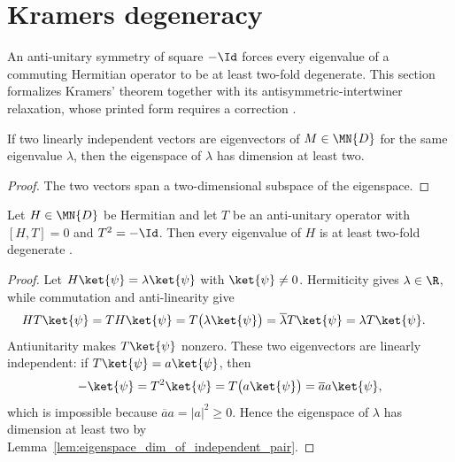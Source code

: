 \section{Kramers degeneracy}
\label{sec:kramers_degeneracy}

An anti-unitary symmetry of square $-\Id$ forces every eigenvalue of a
commuting Hermitian operator to be at least two-fold degenerate.  This section
formalizes Kramers' theorem together with its antisymmetric-intertwiner
relaxation, whose printed form requires a correction
\cite[Chapter~3]{Wolf2012Quantum}.

\begin{lemma}
    \label{lem:eigenspace_dim_of_independent_pair}
    \leanok
    If two linearly independent vectors are eigenvectors of $M\in\MN{D}$ for the
    same eigenvalue $\lambda$, then the eigenspace of $\lambda$ has dimension at
    least two.
\end{lemma}

\begin{proof}\leanok
    The two vectors span a two-dimensional subspace of the eigenspace.
\end{proof}

\begin{theorem}
    \label{thm:kramers_degeneracy}
    \leanok
    Let $H\in\MN{D}$ be Hermitian and let $T$ be an anti-unitary operator with
    $[H,T]=0$ and $T^2=-\Id$.  Then every eigenvalue of $H$ is at least
    two-fold degenerate
    \cite[Chapter~3, Theorem~3.1]{Wolf2012Quantum}.
\end{theorem}

\begin{proof}\leanok
    Let $H\ket{\psi}=\lambda\ket{\psi}$ with $\ket{\psi}\neq 0$.  Hermiticity
    gives $\lambda\in\R$, while commutation and anti-linearity give
    \begin{align}
        H T\ket{\psi}
         & =T H\ket{\psi}
        =T\bigl(\lambda\ket{\psi}\bigr)
        =\overline\lambda T\ket{\psi}
        =\lambda T\ket{\psi}.
    \end{align}
    Antiunitarity makes $T\ket{\psi}$ nonzero.  These two eigenvectors are
    linearly independent: if $T\ket{\psi}=a\ket{\psi}$, then
    \begin{align}
        -\ket{\psi}=T^2\ket{\psi}
        =T\bigl(a\ket{\psi}\bigr)
        =\overline a a\ket{\psi},
    \end{align}
    which is impossible because $\overline a a=|a|^2\geq0$.  Hence the
    eigenspace of $\lambda$ has dimension at least two by
    Lemma~\ref{lem:eigenspace_dim_of_independent_pair}.
\end{proof}


